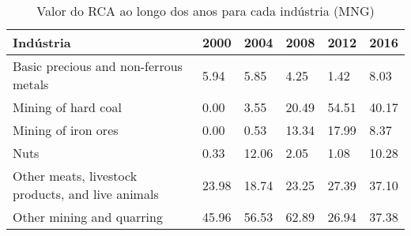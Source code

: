 \begin{table}
\centering
\caption{Valor do RCA ao longo dos anos para cada indústria (MNG)}
\begin{tabular}{p{6cm}p{1.5cm}p{1.5cm}p{1.5cm}p{1.5cm}p{1.5cm}}
\toprule
                                        Indústria &  2000 &  2004 &  2008 &  2012 &  2016 \\
\midrule
            Basic precious and non-ferrous metals &  5.94 &  5.85 &  4.25 &  1.42 &  8.03 \\
                              Mining of hard coal &  0.00 &  3.55 & 20.49 & 54.51 & 40.17 \\
                              Mining of iron ores &  0.00 &  0.53 & 13.34 & 17.99 &  8.37 \\
                                             Nuts &  0.33 & 12.06 &  2.05 &  1.08 & 10.28 \\
Other meats, livestock products, and live animals & 23.98 & 18.74 & 23.25 & 27.39 & 37.10 \\
                        Other mining and quarring & 45.96 & 56.53 & 62.89 & 26.94 & 37.38 \\
\bottomrule
\end{tabular}
\end{table}
